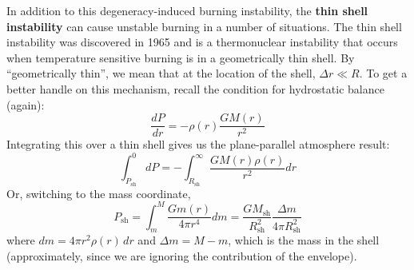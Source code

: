 \documentclass[10pt]{article}
\numberwithin{equation}{section}
\newcommand{\n}{\noindent}
\begin{document}
    \n In addition to this degeneracy-induced burning instability, the
    \textbf{thin shell instability} can cause unstable burning in a number of
    situations. The thin shell instability was discovered in 1965 and is a
    thermonuclear instability that occurs when temperature sensitive burning is
    in a geometrically thin shell. By ``geometrically thin'', we mean that at
    the location of the shell, $\Delta r\ll R$. To get a better handle on this
    mechanism, recall the condition for hydrostatic balance (again):
    \begin{equation}
      \label{eq:283}
      \frac{dP}{dr}=-\rho(r)\frac{GM(r)}{r^2}
    \end{equation}
    Integrating this over a thin shell gives us the plane-parallel
    atmosphere result:
    \begin{equation}
      \label{eq:284}
      \int_{P_{\mathrm{sh}}}^0dP=-\int_{R_{\mathrm{sh}}}^\infty
      \frac{GM(r) \rho(r)}{r^2}dr
    \end{equation}
    Or, switching to the mass coordinate,
    \begin{equation}
      \label{eq:285}
      P_{\mathrm{sh}}=\int_m^M\frac{Gm(r)}{4\pi r^4}dm=\frac{G
        M_{\mathrm{sh}}}{R_{\mathrm{sh}}^2}\frac{\Delta m}{4\pi R_{\mathrm
{sh}}^2}
    \end{equation}
    where $dm=4\pi r^2 \rho(r)\,dr$ and $\Delta m= M-m$, which is
    the mass in the shell (approximately, since we are ignoring the
    contribution of the envelope).\\
\end{document}
